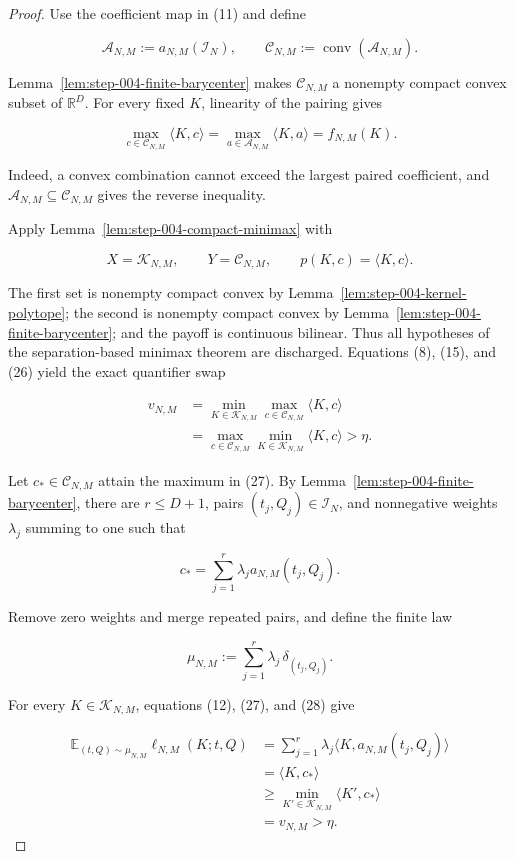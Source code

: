 \begin{proof}
Use the coefficient map in (11) and define

\[
\mathcal A_{N,M}:=a_{N,M}(\mathcal I_N),
\qquad
\mathcal C_{N,M}:=\operatorname{conv}(\mathcal A_{N,M}).
\]

Lemma~\ref{lem:step-004-finite-barycenter} makes
\(\mathcal C_{N,M}\) a nonempty compact convex subset of \(\mathbb R^D\).
For every fixed \(K\), linearity of the pairing gives

\[
\max_{c\in\mathcal C_{N,M}}\langle K,c\rangle
=
\max_{a\in\mathcal A_{N,M}}\langle K,a\rangle
=f_{N,M}(K).
\tag{26}
\]

Indeed, a convex combination cannot exceed the largest paired coefficient,
and \(\mathcal A_{N,M}\subseteq\mathcal C_{N,M}\) gives the reverse
inequality.

Apply Lemma~\ref{lem:step-004-compact-minimax} with

\[
X=\mathcal K_{N,M},
\qquad
Y=\mathcal C_{N,M},
\qquad
p(K,c)=\langle K,c\rangle.
\]

The first set is nonempty compact convex by
Lemma~\ref{lem:step-004-kernel-polytope}; the second is nonempty compact
convex by Lemma~\ref{lem:step-004-finite-barycenter}; and the payoff is
continuous bilinear. Thus all hypotheses of the separation-based minimax
theorem are discharged. Equations (8), (15), and (26) yield the exact
quantifier swap

\[
\begin{aligned}
v_{N,M}
&=\min_{K\in\mathcal K_{N,M}}
  \max_{c\in\mathcal C_{N,M}}\langle K,c\rangle\\
&=\max_{c\in\mathcal C_{N,M}}
  \min_{K\in\mathcal K_{N,M}}\langle K,c\rangle
>\eta.
\end{aligned}
\tag{27}
\]

Let \(c_*\in\mathcal C_{N,M}\) attain the maximum in (27). By
Lemma~\ref{lem:step-004-finite-barycenter}, there are
\(r\le D+1\), pairs \((t_j,Q_j)\in\mathcal I_N\), and nonnegative weights
\(\lambda_j\) summing to one such that

\[
c_*=\sum_{j=1}^r\lambda_j a_{N,M}(t_j,Q_j).
\tag{28}
\]

Remove zero weights and merge repeated pairs, and define the finite law

\[
\mu_{N,M}:=\sum_{j=1}^r\lambda_j\,\delta_{(t_j,Q_j)}.
\tag{29}
\]

For every \(K\in\mathcal K_{N,M}\), equations (12), (27), and (28) give

\[
\begin{aligned}
\mathbb E_{(t,Q)\sim\mu_{N,M}}\ell_{N,M}(K;t,Q)
&=\sum_{j=1}^r\lambda_j
  \langle K,a_{N,M}(t_j,Q_j)\rangle\\
&=\langle K,c_*\rangle\\
&\ge\min_{K'\in\mathcal K_{N,M}}\langle K',c_*\rangle\\
&=v_{N,M}>\eta.
\end{aligned}
\tag{30}
\]


\end{proof}
